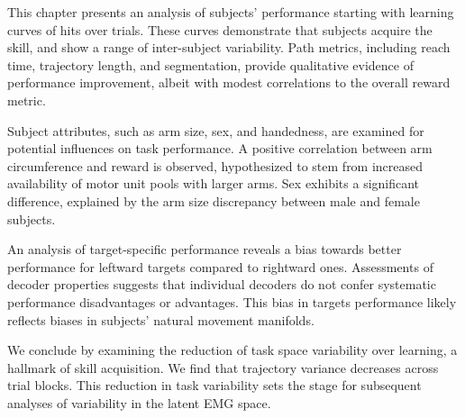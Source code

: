 \documentclass[../main.tex]{subfiles}
\begin{document}
This chapter presents an analysis of subjects' performance starting with learning curves of hits over trials. These curves demonstrate that subjects acquire the skill, and show a range of inter-subject variability. Path metrics, including reach time, trajectory length, and segmentation, provide qualitative evidence of performance improvement, albeit with modest correlations to the overall reward metric.

Subject attributes, such as arm size, sex, and handedness, are examined for potential influences on task performance. A positive correlation between arm circumference and reward is observed, hypothesized to stem from increased availability of motor unit pools with larger arms. Sex exhibits a significant difference, explained by the arm size discrepancy between male and female subjects.

An analysis of target-specific performance reveals a bias towards better performance for leftward targets compared to rightward ones. Assessments of decoder properties suggests that individual decoders do not confer systematic performance disadvantages or advantages. This bias in targets performance likely reflects biases in subjects' natural movement manifolds.

We conclude by examining the reduction of task space variability over learning, a hallmark of skill acquisition. We find that trajectory variance decreases across trial blocks. This reduction in task variability sets the stage for subsequent analyses of variability in the latent EMG space.


\ifSubfilesClassLoaded{%
    \newpage%
}{}%
\end{document}
